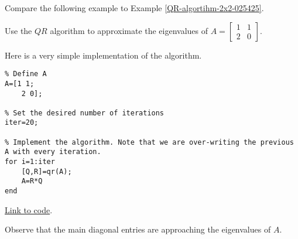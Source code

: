 \documentclass{ximera}
\begin{document}
Compare the following example to Example \ref{QR-algortihm-2x2-025425}.

\begin{example}\label{ex:qrEig}
Use the $QR$ algorithm to approximate the eigenvalues of $A=\begin{bmatrix}1 & 1\\2 & 0\end{bmatrix}$.  

\begin{explanation}
    Here is a very simple implementation of the algorithm.  

    \begin{verbatim}
% Define A
A=[1 1;
    2 0];

% Set the desired number of iterations
iter=20;  

% Implement the algorithm. Note that we are over-writing the previous A with every iteration.
for i=1:iter
    [Q,R]=qr(A);
    A=R*Q
end    
    \end{verbatim}

\href{https://sagecell.sagemath.org/?z=eJwtjbEKwkAQRPuF_YdpAioWuZSGKw78gcQypFBuD7fwDjfn_5tDp3oMvJkOV0maBYEp-MXBjUzYM6Bfd2TqcJOK-hRE2dQkIn9eDzGUBK1i96olb0yN_dCPQLNSMah3l9b-BpfpPK_-bYdw_F8EP58mJsnxCzFCIso=&lang=octave&interacts=eJyLjgUAARUAuQ==}{Link to code}.   

Observe that the main diagonal entries are approaching the eigenvalues of $A$.
\end{explanation}
    
\end{example}
\end{document}
